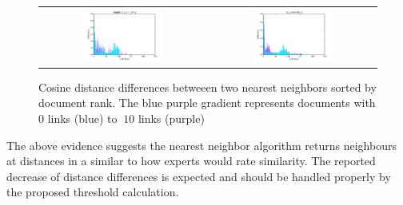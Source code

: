 \begin{figure}[h!]
\begin{tabular}{cc}
\includegraphics[width =0.5\textwidth]{images/thresh_cosine_simple_tag_similarity_distances} 	& \includegraphics[width =0.5\textwidth]{images/thresh_cosine_tag_smoothing_distances}
\end{tabular}
\caption{Cosine distance differences betweeen two nearest neighbors sorted by document rank. The blue purple gradient represents documents with 0 links (blue) to $\>10$ links (purple)}
\label{fig:thresholds_differences}
\end{figure}

The above evidence suggests the nearest neighbor algorithm returns neighbours 
at distances in a similar to how experts would rate similarity. The reported decrease
of distance differences is expected and should be handled properly by the proposed
threshold calculation.

